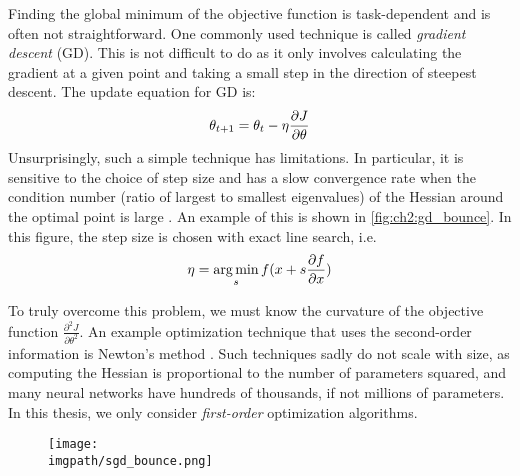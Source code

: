   Finding the global minimum of the objective
  function is task-dependent and is often not straightforward. One commonly used
  technique is called \emph{gradient descent} (GD). This is not difficult to do as
  it only involves calculating the gradient at a given point and taking a small
  step in the direction of steepest descent. The update equation for GD is:
  \begin{equation}\label{eq:ch2:gd}
    \theta_{t+1} = \theta_t - \eta \frac{\partial J}{\partial \theta}
  \end{equation}
  Unsurprisingly, such a simple technique has limitations. In particular, it
  is sensitive to the choice of step size and
  has a slow convergence rate when the condition number (ratio of largest to
  smallest eigenvalues) of the Hessian around the optimal point is large
  \cite{boyd_convex_2004}. An example of this is shown in
  \autoref{fig:ch2:gd_bounce}. In this figure, the step size is chosen with
  exact line search, i.e.
  \begin{equation}\label{eq:ch2:search}
    \eta = \operatorname*{arg\,min}_s f(x + s \frac{\partial f}{\partial x})
  \end{equation}

  To truly overcome this problem, we must know the curvature
  of the objective function $\frac{\partial^2 J}{\partial \theta^2}$. An example
  optimization technique that uses the second-order information is Newton's
  method \cite[Chapter~9]{boyd_convex_2004}. Such techniques sadly do not scale
  with size, as computing the Hessian is proportional to the number of
  parameters squared, and many neural networks have hundreds of thousands, if
  not millions of parameters. In this thesis, we only consider
  \emph{first-order} optimization algorithms.

  \begin{figure}[t]
  \centering
  \texttt{[image: \\imgpath/sgd\_bounce.png]}
  \label{fig:ch2:gd_bounce}
\end{figure}

